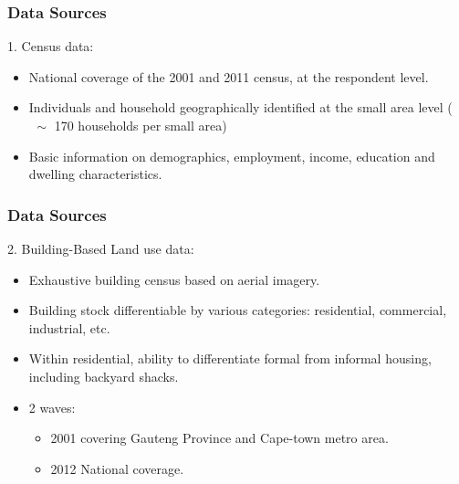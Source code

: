 \documentclass[aspectratio=149]{beamer}
\begin{document}
\begin{frame}
\frametitle{Data Sources}
1. Census data:
\vspace{2mm}
  \begin{itemize}
    \item National coverage of the 2001 and 2011 census, at the respondent level. 

    \item Individuals and household geographically identified at the small area level ($\,\,\sim$ 170 households per small area)
    \vspace{2mm}
    \item  Basic information on demographics, employment, income, education and dwelling characteristics.

\end{itemize}
\end{frame}


\begin{frame}
\frametitle{Data Sources}
2. Building-Based Land use data:
\vspace{2mm}
  \begin{itemize}
    \item Exhaustive building census based on aerial imagery.
    \vspace{2mm}
    \item Building stock differentiable by various categories: residential, commercial, industrial, etc.
    \vspace{2mm}
    \item Within residential, ability to differentiate formal from informal housing, including backyard shacks.
    \vspace{2mm}
    \item 2 waves:
    \begin{itemize} 
      \item 2001 covering Gauteng Province and Cape-town metro area.
      \item 2012 National coverage.
    \end{itemize}
\end{itemize}
\end{frame}


\end{document}
